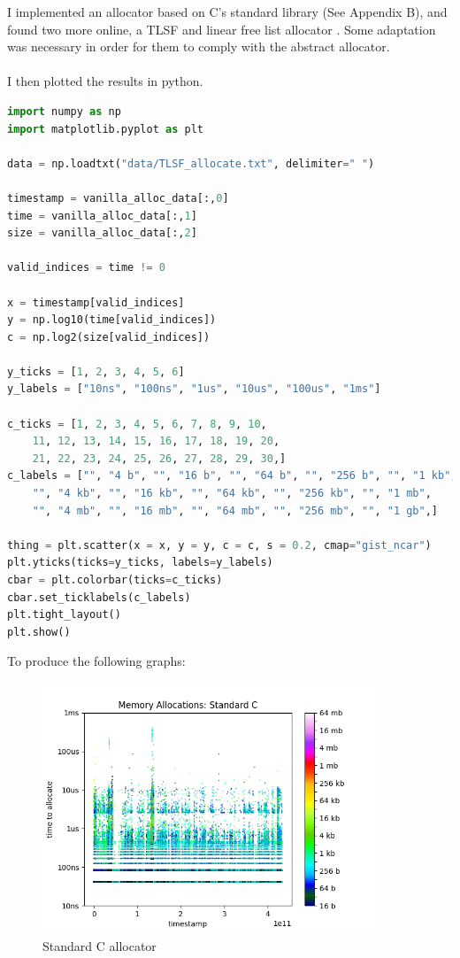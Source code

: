 \documentclass{article}
\begin{document}
I implemented an allocator based on C's standard library (See Appendix B), and found two more online, a TLSF \cite{TLSF-implementation} and linear free list allocator \cite{free-list-implementation}. Some adaptation was necessary in order for them to comply with the abstract allocator.\\
\\
I then plotted the results in python.\\
\begin{lstlisting}[language=Python]
import numpy as np
import matplotlib.pyplot as plt
	
data = np.loadtxt("data/TLSF_allocate.txt", delimiter=" ")
	
timestamp = vanilla_alloc_data[:,0]
time = vanilla_alloc_data[:,1]
size = vanilla_alloc_data[:,2]

valid_indices = time != 0
	
x = timestamp[valid_indices]
y = np.log10(time[valid_indices])
c = np.log2(size[valid_indices])
	
y_ticks = [1, 2, 3, 4, 5, 6]
y_labels = ["10ns", "100ns", "1us", "10us", "100us", "1ms"]
	
c_ticks = [1, 2, 3, 4, 5, 6, 7, 8, 9, 10,
	11, 12, 13, 14, 15, 16, 17, 18, 19, 20,
	21, 22, 23, 24, 25, 26, 27, 28, 29, 30,]
c_labels = ["", "4 b", "", "16 b", "", "64 b", "", "256 b", "", "1 kb",
	"", "4 kb", "", "16 kb", "", "64 kb", "", "256 kb", "", "1 mb",
	"", "4 mb", "", "16 mb", "", "64 mb", "", "256 mb", "", "1 gb",]
	
thing = plt.scatter(x = x, y = y, c = c, s = 0.2, cmap="gist_ncar")
plt.yticks(ticks=y_ticks, labels=y_labels)
cbar = plt.colorbar(ticks=c_ticks)
cbar.set_ticklabels(c_labels)
plt.tight_layout()
plt.show()
\end{lstlisting}
\pagebreak
To produce the following graphs:\\
\begin{figure}[h]
	\centering
	\includegraphics[width=10cm]{results_vanilla_alloc}
	\captionsetup{width=10cm}
	\caption{Standard C allocator}
\end{figure}
\end{document}

